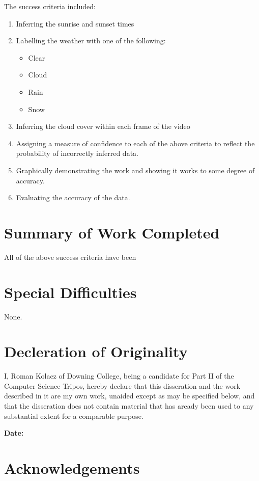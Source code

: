 \documentclass[14]{report}
\begin{document}
The success criteria included:
\begin{enumerate}
  \item Inferring the sunrise and sunset times
  \item Labelling the weather with one of the following:
    \begin{itemize}
      \item Clear
      \item Cloud
      \item Rain
      \item Snow
    \end{itemize}
  \item Inferring the cloud cover within each frame of the video
  \item Assigning a measure of confidence to each of the above criteria to reflect the probability of incorrectly inferred data.
  \item Graphically demonstrating the work and showing it works to some degree of accuracy.
  \item Evaluating the accuracy of the data.
\end{enumerate}

\section*{Summary of Work Completed}
All of the above success criteria have been

\section*{Special Difficulties}
None.

\section*{Decleration of Originality}
I, Roman Kolacz of Downing College, being a candidate for Part II of the Computer Science Tripos, hereby declare that this disseration and the work described in it are my own work, unaided except as may be specified below, and that the disseration does not contain material that has aready been used to any substantial extent for a comparable purpose.

\bigskip
{}

\bigskip
\leftline\bf{\bf Date:}

\newpage

\section*{Acknowledgements}
\end{document}
